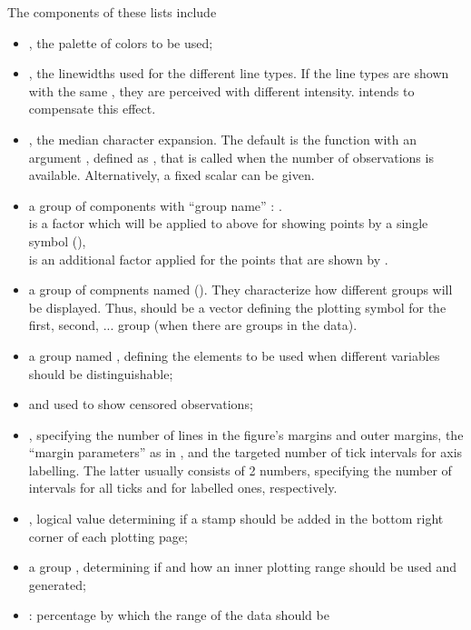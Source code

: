 \documentclass[11pt]{article}\usepackage[]{graphicx}\usepackage[]{color}
\begin{document}
The components of these lists include
\begin{itemize}
\item 
  , the palette of colors to be used;
\item
  , the linewidths used for the different line types.
  If the line types are shown with the same , they are perceived
  with different intensity.  intends to compensate this effect.
\item
  , the median character expansion.
  The default is the function  with an argument , defined as
  , that is called when the number  of
  observations is available. Alternatively, a fixed scalar can be given.
\item
  a group of components with ``group name'' :
  .\\
   is a factor which will be applied to  above for
  showing points by a single symbol (),\\
   is an additional factor applied for the points that
  are shown by .
\item
  a group of compnents named  ().
  They characterize how different groups will be displayed.
  Thus,  should be a vector defining the plotting symbol
  for the first, second, ... group (when there are groups in the data).
\item
  a group named , 
  defining the elements to be used when different variables should be
  distinguishable;
\item
   and  used to show censored observations;
\item
  , specifying the number of lines in the
  figure's margins and outer margins, the ``margin parameters'' as in
  , and the targeted number of tick intervals for axis labelling.
  The latter usually consists of 2 numbers, specifying the number of
  intervals for all ticks and for labelled ones, respectively. 
\item
  , logical value determining if a stamp should be added in the
  bottom right corner of each plotting page;
\item
  a group , determining if and how an inner plotting range
  should be used and generated;
\item
  : percentage by which the range of the data should be

\end{itemize}
\end{document}
